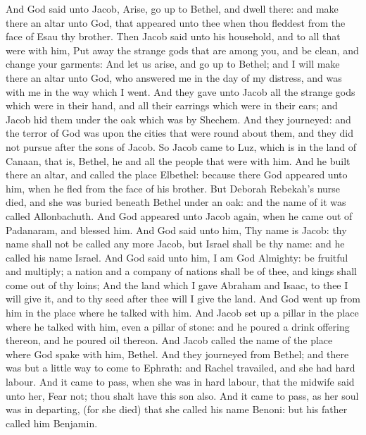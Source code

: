\begin{biblechapter} %
 And God said unto Jacob, Arise, go up to Bethel, and dwell there: and make there an altar unto God, that appeared unto thee when thou fleddest from the face of Esau thy brother.
\verse Then Jacob said unto his household, and to all that were with him, Put away the strange gods that are among you, and be clean, and change your garments:
\verse And let us arise, and go up to Bethel; and I will make there an altar unto God, who answered me in the day of my distress, and was with me in the way which I went.
\verse And they gave unto Jacob all the strange gods which were in their hand, and all their earrings which were in their ears; and Jacob hid them under the oak which was by Shechem.
\verse And they journeyed: and the terror of God was upon the cities that were round about them, and they did not pursue after the sons of Jacob.
\verse So Jacob came to Luz, which is in the land of Canaan, that is, Bethel, he and all the people that were with him.
\verse And he built there an altar, and called the place Elbethel: because there God appeared unto him, when he fled from the face of his brother.
\verse But Deborah Rebekah's nurse died, and she was buried beneath Bethel under an oak: and the name of it was called Allonbachuth.
\verse And God appeared unto Jacob again, when he came out of Padanaram, and blessed him.
\verse And God said unto him, Thy name is Jacob: thy name shall not be called any more Jacob, but Israel shall be thy name: and he called his name Israel.
\verse And God said unto him, I am God Almighty: be fruitful and multiply; a nation and a company of nations shall be of thee, and kings shall come out of thy loins;
\verse And the land which I gave Abraham and Isaac, to thee I will give it, and to thy seed after thee will I give the land.
\verse And God went up from him in the place where he talked with him.
\verse And Jacob set up a pillar in the place where he talked with him, even a pillar of stone: and he poured a drink offering thereon, and he poured oil thereon.
\verse And Jacob called the name of the place where God spake with him, Bethel.
 And they journeyed from Bethel; and there was but a little way to come to Ephrath: and Rachel travailed, and she had hard labour.
\verse And it came to pass, when she was in hard labour, that the midwife said unto her, Fear not; thou shalt have this son also.
\verse And it came to pass, as her soul was in departing, (for she died) that she called his name Benoni: but his father called him Benjamin.

\end{biblechapter}
